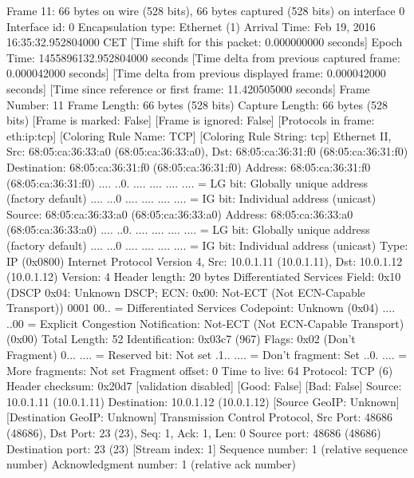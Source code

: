 Frame 11: 66 bytes on wire (528 bits), 66 bytes captured (528 bits) on interface 0
    Interface id: 0
    Encapsulation type: Ethernet (1)
    Arrival Time: Feb 19, 2016 16:35:32.952804000 CET
    [Time shift for this packet: 0.000000000 seconds]
    Epoch Time: 1455896132.952804000 seconds
    [Time delta from previous captured frame: 0.000042000 seconds]
    [Time delta from previous displayed frame: 0.000042000 seconds]
    [Time since reference or first frame: 11.420505000 seconds]
    Frame Number: 11
    Frame Length: 66 bytes (528 bits)
    Capture Length: 66 bytes (528 bits)
    [Frame is marked: False]
    [Frame is ignored: False]
    [Protocols in frame: eth:ip:tcp]
    [Coloring Rule Name: TCP]
    [Coloring Rule String: tcp]
Ethernet II, Src: 68:05:ca:36:33:a0 (68:05:ca:36:33:a0), Dst: 68:05:ca:36:31:f0 (68:05:ca:36:31:f0)
    Destination: 68:05:ca:36:31:f0 (68:05:ca:36:31:f0)
        Address: 68:05:ca:36:31:f0 (68:05:ca:36:31:f0)
        .... ..0. .... .... .... .... = LG bit: Globally unique address (factory default)
        .... ...0 .... .... .... .... = IG bit: Individual address (unicast)
    Source: 68:05:ca:36:33:a0 (68:05:ca:36:33:a0)
        Address: 68:05:ca:36:33:a0 (68:05:ca:36:33:a0)
        .... ..0. .... .... .... .... = LG bit: Globally unique address (factory default)
        .... ...0 .... .... .... .... = IG bit: Individual address (unicast)
    Type: IP (0x0800)
Internet Protocol Version 4, Src: 10.0.1.11 (10.0.1.11), Dst: 10.0.1.12 (10.0.1.12)
    Version: 4
    Header length: 20 bytes
    Differentiated Services Field: 0x10 (DSCP 0x04: Unknown DSCP; ECN: 0x00: Not-ECT (Not ECN-Capable Transport))
        0001 00.. = Differentiated Services Codepoint: Unknown (0x04)
        .... ..00 = Explicit Congestion Notification: Not-ECT (Not ECN-Capable Transport) (0x00)
    Total Length: 52
    Identification: 0x03c7 (967)
    Flags: 0x02 (Don't Fragment)
        0... .... = Reserved bit: Not set
        .1.. .... = Don't fragment: Set
        ..0. .... = More fragments: Not set
    Fragment offset: 0
    Time to live: 64
    Protocol: TCP (6)
    Header checksum: 0x20d7 [validation disabled]
        [Good: False]
        [Bad: False]
    Source: 10.0.1.11 (10.0.1.11)
    Destination: 10.0.1.12 (10.0.1.12)
    [Source GeoIP: Unknown]
    [Destination GeoIP: Unknown]
Transmission Control Protocol, Src Port: 48686 (48686), Dst Port: 23 (23), Seq: 1, Ack: 1, Len: 0
    Source port: 48686 (48686)
    Destination port: 23 (23)
    [Stream index: 1]
    Sequence number: 1    (relative sequence number)
    Acknowledgment number: 1    (relative ack number)
